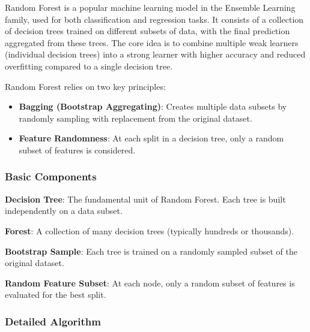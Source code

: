 Random Forest is a popular machine learning model in the Ensemble Learning family, used for both classification and regression tasks.
It consists of a collection of decision trees trained on different subsets of data, with the final prediction aggregated from these trees.
The core idea is to combine multiple weak learners (individual decision trees) into a strong learner with higher accuracy and reduced overfitting compared to a single decision tree.

Random Forest relies on two key principles:

\begin{itemize}
    \item \textbf{Bagging (Bootstrap Aggregating)}: Creates multiple data subsets by randomly sampling with replacement from the original dataset.
    \item \textbf{Feature Randomness}: At each split in a decision tree, only a random subset of features is considered.
\end{itemize}

\subsubsection{Basic Components}\text{}

\smallskip
\textbf{Decision Tree}: The fundamental unit of Random Forest.
Each tree is built independently on a data subset.

\textbf{Forest}: A collection of many decision trees (typically hundreds or thousands).

\textbf{Bootstrap Sample}: Each tree is trained on a randomly sampled subset of the original dataset.

\textbf{Random Feature Subset}: At each node, only a random subset of features is evaluated for the best split.

\smallskip

\subsubsection{Detailed Algorithm}\text{}

